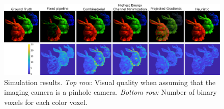\begin{figure}[h!]
\centering
\includegraphics[width=0.99\columnwidth]{images/volumetric/acd_exp3/exp_pinhole}
\caption[Adaptive color decomposition: pinhole-camera reconstruction and number of binary voxels]{Simulation results. \emph{Top row:} Visual quality when assuming that the imaging camera is a pinhole camera. \emph{Bottom row:} Number of binary voxels for each color voxel.}
\label{fig:volumetric:acd:exp3:pinhole}
\end{figure}

